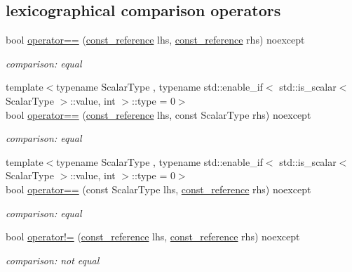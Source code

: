 \subsection*{lexicographical comparison operators}
\begin{DoxyCompactItemize}
\item 
bool \hyperlink{classnlohmann_1_1basic__json_a122640e7e2db1814fc7bbb3c122ec76e}{operator==} (\hyperlink{classnlohmann_1_1basic__json_ab8a1c33ee7b154fc41ca2545aa9724e6}{const\+\_\+reference} lhs, \hyperlink{classnlohmann_1_1basic__json_ab8a1c33ee7b154fc41ca2545aa9724e6}{const\+\_\+reference} rhs) noexcept
\begin{DoxyCompactList}\small\item\em comparison\+: equal \end{DoxyCompactList}\item 
{\footnotesize template$<$typename Scalar\+Type , typename std\+::enable\+\_\+if$<$ std\+::is\+\_\+scalar$<$ Scalar\+Type $>$\+::value, int $>$\+::type  = 0$>$ }\\bool \hyperlink{classnlohmann_1_1basic__json_aba21440ea1aff44f718285ed7d6d20d9}{operator==} (\hyperlink{classnlohmann_1_1basic__json_ab8a1c33ee7b154fc41ca2545aa9724e6}{const\+\_\+reference} lhs, const Scalar\+Type rhs) noexcept
\begin{DoxyCompactList}\small\item\em comparison\+: equal \end{DoxyCompactList}\item 
{\footnotesize template$<$typename Scalar\+Type , typename std\+::enable\+\_\+if$<$ std\+::is\+\_\+scalar$<$ Scalar\+Type $>$\+::value, int $>$\+::type  = 0$>$ }\\bool \hyperlink{classnlohmann_1_1basic__json_aef302e3ae215e46e5035d0e4fdf47235}{operator==} (const Scalar\+Type lhs, \hyperlink{classnlohmann_1_1basic__json_ab8a1c33ee7b154fc41ca2545aa9724e6}{const\+\_\+reference} rhs) noexcept
\begin{DoxyCompactList}\small\item\em comparison\+: equal \end{DoxyCompactList}\item 
bool \hyperlink{classnlohmann_1_1basic__json_a6e2e21da48f5d9471716cd868a068327}{operator!=} (\hyperlink{classnlohmann_1_1basic__json_ab8a1c33ee7b154fc41ca2545aa9724e6}{const\+\_\+reference} lhs, \hyperlink{classnlohmann_1_1basic__json_ab8a1c33ee7b154fc41ca2545aa9724e6}{const\+\_\+reference} rhs) noexcept
\begin{DoxyCompactList}\small\item\em comparison\+: not equal \end{DoxyCompactList}\item 

\end{DoxyCompactItemize}
